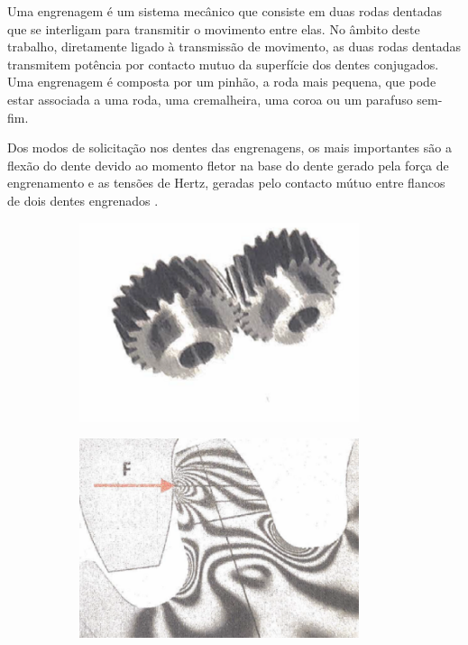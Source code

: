 Uma engrenagem é um sistema mecânico que consiste em duas rodas dentadas que se interligam para transmitir o movimento entre elas. No âmbito deste trabalho, diretamente ligado à transmissão de movimento, as duas rodas dentadas transmitem potência por contacto mutuo da superfície dos dentes conjugados. Uma engrenagem é composta por um pinhão, a roda mais pequena, que pode estar associada a uma roda, uma cremalheira, uma coroa ou um parafuso sem-fim.
\par
Dos modos de solicitação nos dentes das engrenagens, os mais importantes são a flexão do dente devido ao momento fletor na base do dente gerado pela força de engrenamento e as tensões de Hertz, geradas pelo contacto mútuo entre flancos de dois dentes engrenados \cite{Completo2019}.
\begin{figure}[htb]
    \centering
    \begin{subfigure}{.5\textwidth}
        \centering
        \includegraphics[width = 0.9\textwidth]{Figures/Cap2/Completo_rodas.png}
        \caption{}
        \label{fig:dentes elicoidais}
    \end{subfigure}%
    \begin{subfigure}{.5\textwidth}
        \centering
        \includegraphics[width = 0.9\textwidth]{Figures/Cap2/Completo2019.png}

\end{subfigure}
\end{figure}
